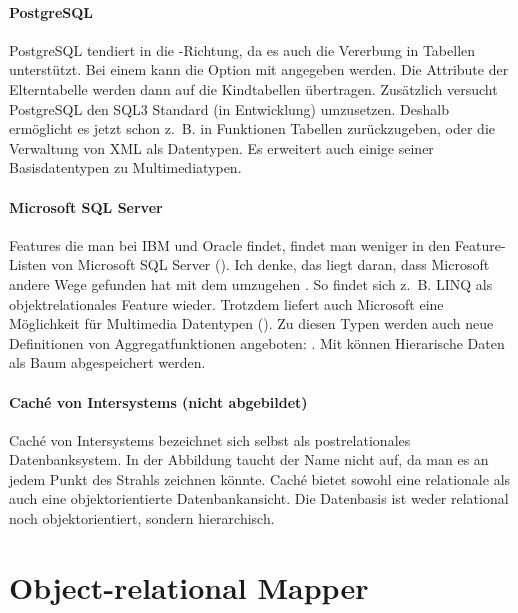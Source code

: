 \paragraph{PostgreSQL}
PostgreSQL tendiert in die \ODBMS-Richtung, da es auch die Vererbung in Tabellen unterstützt. Bei einem  kann die Option  mit angegeben werden. Die Attribute der Elterntabelle werden dann auf die Kindtabellen übertragen. Zusätzlich versucht PostgreSQL den SQL3 Standard (in Entwicklung) umzusetzen. Deshalb ermöglicht es jetzt schon z.~B. in Funktionen Tabellen zurückzugeben, oder die Verwaltung von XML als Datentypen. Es erweitert auch einige seiner Basisdatentypen zu Multimediatypen. \\

\paragraph{Microsoft SQL Server}
Features die man bei IBM und Oracle findet, findet man weniger in den Feature-Listen von Microsoft SQL Server (\cite{sql-server-2008}). Ich denke, das liegt daran, dass Microsoft andere Wege gefunden hat mit dem \IM umzugehen \cite{meijer-linq-visual-basic}. So findet sich z.~B. LINQ als objektrelationales Feature wieder. Trotzdem liefert auch Microsoft eine Möglichkeit für Multimedia Datentypen (). Zu diesen Typen werden auch neue Definitionen von Aggregatfunktionen angeboten: . Mit  können Hierarische Daten als Baum abgespeichert werden.\\

\paragraph{Caché von Intersystems (nicht abgebildet)} Caché von Intersystems \cite{cache-intersystems} bezeichnet sich selbst als postrelationales Datenbanksystem. In der Abbildung taucht der Name nicht auf, da man es an jedem Punkt des Strahls zeichnen könnte. Caché bietet sowohl eine relationale als auch eine objektorientierte Datenbankansicht. Die Datenbasis ist weder relational noch objektorientiert, sondern hierarchisch.\\

\section{Object-relational Mapper}

